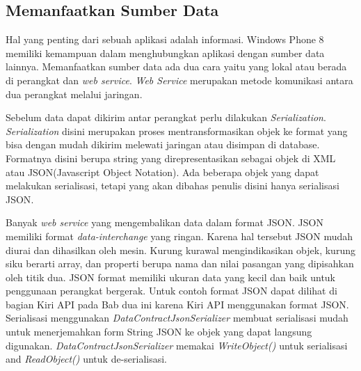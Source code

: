 \subsection{Memanfaatkan Sumber Data}
\label{subsec:Memanfaatkan Sumber Data}
\hspace{0.5cm} Hal yang penting dari sebuah aplikasi adalah informasi. Windows Phone 8 memiliki kemampuan dalam menghubungkan aplikasi dengan sumber data lainnya. Memanfaatkan sumber data ada dua cara yaitu yang lokal atau berada di perangkat dan \textit{web service}. \textit{Web Service} merupakan metode komunikasi antara dua perangkat melalui jaringan. 

Sebelum data dapat dikirim antar perangkat perlu dilakukan \textit{Serialization}. \textit{Serialization} disini merupakan proses mentransformasikan objek ke format yang bisa dengan mudah dikirim melewati jaringan atau disimpan di database. Formatnya disini berupa string yang direpresentasikan sebagai objek di XML atau JSON(Javascript Object Notation). Ada beberapa objek yang dapat melakukan serialisasi, tetapi yang akan dibahas penulis disini hanya serialisasi JSON\cite{Manning}. 

Banyak \textit{web service} yang mengembalikan data dalam format JSON. JSON memiliki format \textit{data-interchange} yang ringan. Karena hal tersebut JSON mudah diurai dan dihasilkan oleh mesin. Kurung kurawal mengindikasikan objek, kurung siku berarti array, dan properti berupa nama dan nilai pasangan yang dipisahkan oleh titik dua. JSON format memiliki ukuran data yang kecil dan baik untuk penggunaan perangkat bergerak. Untuk contoh format JSON dapat dilihat di bagian Kiri API pada Bab dua ini karena Kiri API menggunakan format JSON. Serialisasi menggunakan \textit{DataContractJsonSerializer} membuat serialisasi mudah untuk menerjemahkan form String JSON ke objek yang dapat langsung digunakan. \textit{DataContractJsonSerializer} memakai \textit{WriteObject()} untuk serialisasi and \textit{ReadObject()} untuk de-serialisasi.

